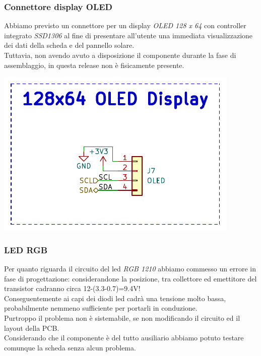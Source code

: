 \hypertarget{connettore-display-oled}{%
\subsubsection{\texorpdfstring{Connettore display OLED\\
}{Connettore display OLED }}\label{connettore-display-oled}}

Abbiamo previsto un connettore per un display \emph{OLED 128 x 64} con
controller integrato \emph{SSD1306} al fine di presentare all'utente una
immediata visualizzazione dei dati della scheda e del pannello solare.\\
Tuttavia, non avendo avuto a disposizione il componente durante la fase
di assemblaggio, in questa release non è fisicamente presente.

\begin{center}
\includegraphics[scale=0.7]{figures/image58.png}
\captionsetup{type=figure}
\end{center}

\hypertarget{led-rgb}{%
\subsubsection{\texorpdfstring{\hfill\break
\hfill\break
LED RGB}{  LED RGB}}\label{led-rgb}}

Per quanto riguarda il circuito del led \emph{RGB 1210} abbiamo commesso
un errore in fase di progettazione: considerandone la posizione, tra
collettore ed emettitore del transistor cadranno circa
12-(3.3-0.7)=9.4V!\\
Conseguentemente ai capi dei diodi led cadrà una tensione molto bassa,
probabilmente nemmeno sufficiente per portarli in conduzione.\\
Purtroppo il problema non è sistemabile, se non modificando il circuito
ed il layout della PCB.\\
Considerando che il componente è del tutto ausiliario abbiamo potuto
testare comunque la scheda senza alcun problema.

